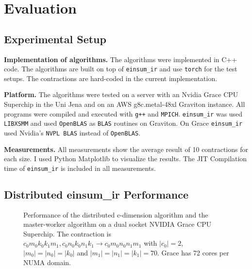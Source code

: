 \section{Evaluation}

\subsection{Experimental Setup}

\textbf{Implementation of algorithms.}
The algorithms were implemented in C++ code.
The algorithms are built on top of \texttt{einsum\_ir} and use \texttt{torch} for the test setups.
The contractions are hard-coded in the current implementation.

\textbf{Platform.}
The algorithms were tested on a server with an Nvidia Grace CPU Superchip in the Uni Jena and on an AWS g8c.metal-48xl Graviton instance.
All programs were compiled and executed with \texttt{g++} and \texttt{MPICH}.
\texttt{einsum\_ir} was used \texttt{LIBXSMM} and  used \texttt{OpenBLAS} as \texttt{BLAS} routines on Graviton.
On Grace \texttt{einsum\_ir} used Nvidia's \texttt{NVPL BLAS} instead of \texttt{OpenBLAS}.

\textbf{Measurements.}
All measurements show the average result of 10 contractions for each size.
I used Python Matplotlib\cite{matplotlib} to visualize the results.
The JIT Compilation time of \texttt{einsum\_ir} is included in all measurements.


\subsection{Distributed einsum\_ir Performance}

\begin{figure}[ht]
  \caption{
    Performance of the distributed c-dimension algorithm and the master-worker algorithm on a dual socket NVIDIA Grace CPU Superchip.
    The contraction is $c_0m_0k_0k_1m_1, c_0n_0k_0n_1k_1 \rightarrow c_0m_0n_0n_1m_1$ with $|c_0|=2$, $|m_0|=|n_0|=|k_0|$ and $|m_1|=|n_1|=|k_1|=70$.
    Grace has 72 cores per NUMA domain.
    }
  \label{fig:master_worker_perf}
\end{figure}

